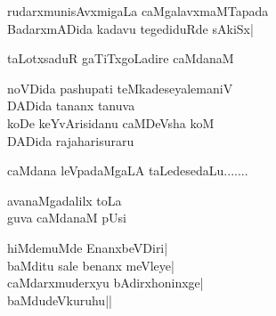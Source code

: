 \begin{entry}
\begin{shl}
rudarxmunisAvxmigaLa caMgalavxmaMTapada\\
BadarxmADida kadavu tegediduRde sAkiSx|
\end{shl}
\end{entry}

\begin{entry}
\gl{}
\begin{shl}
taLotxsaduR gaTiTxgoLadire caMdanaM
\end{shl}
\end{entry}

\begin{entry}
\gl{}
\begin{shl}
noVDida pashupati teMkadeseyalemaniV\\
DADida tananx tanuva\\
koDe keYvArisidanu caMDeVsha koM\\
DADida raja{ha}risuraru
\end{shl}
\end{entry}

\begin{entry}
\gl{}
\begin{shl}
caMdana leVpadaMgaLA taLedesedaLu.......
\end{shl}
\gl{}
\begin{shl}
avanaMgadalilx toLa\\
guva caMdanaM pUsi
\end{shl}
\end{entry}

\begin{entry}
\end{entry}

\begin{entry}
\begin{shl}
hiMdemuMde EnanxbeVDiri|\\
baMditu sale benanx meVleye|\\
caMdarxmuderxyu bAdirxhoninxge|\\
baMdudeVkuruhu||
\end{shl}
\end{entry}

